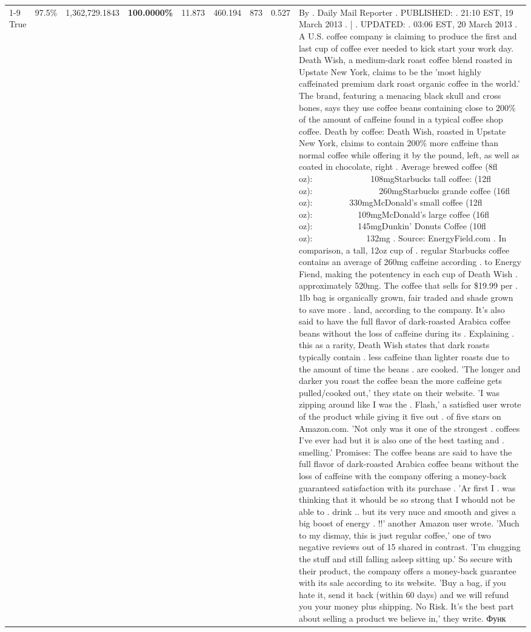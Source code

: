 \begin{table}[H]
{\begin{tabular}{lllrlllll}
\cline{1-9}
True & 97.5\% & 1,362,729.1843 & \bfseries \color{red} 100.0000\% & 11.873 & 460.194 & 873 & 0.527 & By . Daily Mail Reporter . PUBLISHED: . 21:10 EST, 19 March 2013 . | . UPDATED: . 03:06 EST, 20 March 2013 . A U.S. coffee company is claiming to produce the first and last cup of coffee ever needed to kick start your work day. Death Wish, a medium-dark roast coffee blend roasted in Upstate New York, claims to be the 'most highly caffeinated premium dark roast organic coffee in the world.' The brand, featuring a menacing black skull and cross bones, says they use coffee beans containing close to 200\% of the amount of caffeine found in a typical coffee shop coffee. Death by coffee: Death Wish, roasted in Upstate New York, claims to contain 200\% more caffeine than normal coffee while offering it by the pound, left, as well as coated in chocolate, right . Average brewed coffee (8fl oz):              108mgStarbucks tall coffee: (12fl oz):                260mgStarbucks grande coffee (16fl oz):         330mgMcDonald's small coffee (12fl oz):           109mgMcDonald's large coffee (16fl oz):           145mgDunkin' Donuts Coffee (10fl oz):             132mg . Source: EnergyField.com . In comparison, a tall, 12oz cup of . regular Starbucks coffee contains an average of 260mg caffeine according . to Energy Fiend, making the potentency in each cup of Death Wish . approximately 520mg. The coffee that sells for \$19.99 per . 1lb bag is organically grown, fair traded and shade grown to save more . land, according to the company. It's also said to have the full flavor of dark-roasted Arabica coffee beans without the loss of caffeine during its . Explaining . this as a rarity, Death Wish states that dark roasts typically contain . less caffeine than lighter roasts due to the amount of time the beans . are cooked. 'The longer and darker you roast the coffee bean the more caffeine gets pulled/cooked out,' they state on their website. 'I was zipping around like I was the . Flash,' a satisfied user wrote of the product while giving it five out . of five stars on Amazon.com. 'Not only was it one of the strongest . coffees I've ever had but it is also one of the best tasting and . smelling.’ Promises: The coffee beans are said to have the full flavor of dark-roasted Arabica coffee beans without the loss of caffeine with the company offering a money-back guaranteed satisfaction with its purchase . 'Ar first I . was thinking that it whould be so strong that I whould not be able to . drink .. but its very nuce and smooth and gives a big boost of energy . !!' another Amazon user wrote. 'Much to my dismay, this is just regular coffee,' one of two negative reviews out of 15 shared in contrast. 'I'm chugging the stuff and still falling asleep sitting up.' So secure with their product, the company offers a money-back guarantee with its sale according to its website. 'Buy a bag, if you hate it, send it back (within 60 days) and we will refund you your money plus shipping. No Risk. It’s the best part about selling a product we believe in,' they write. Функ \\

\end{tabular}}
\end{table}
